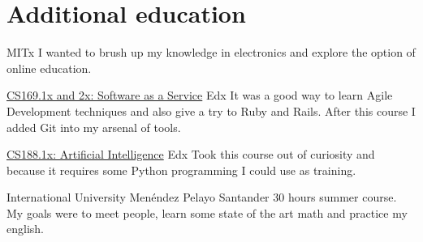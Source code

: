 \documentclass[11pt,a4paper,roman]{moderncv}
\begin{document}

\section{Additional education}


	{MITx}
	{}
	{}
	{I wanted to brush up my knowledge in electronics and explore the option of online education.} 

	{\href{https://www.edx.org/courses/BerkeleyX/CS169.1x/2013_Spring/about}
	{CS169.1x and 2x: Software as a Service}}
	{Edx}
	{}
	{}
	{It was a good way to learn Agile Development techniques and also give a try to Ruby and Rails. After this course I added Git into my arsenal of tools.} 

	{\href{https://6002x.mitx.mit.edu/}
	{CS188.1x: Artificial Intelligence}}
	{Edx}
	{}
	{}
	{Took this course out of curiosity and because it requires some Python programming I could use as training.} 



	{International University Men\'endez Pelayo}
	{Santander}
	{}
	{30 hours summer course. My goals were to meet people, learn some state of the art math and practice my english.}
\end{document}

